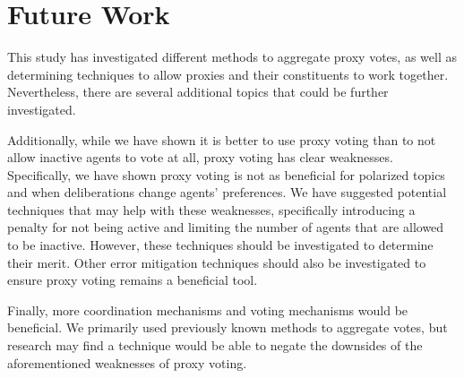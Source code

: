 \section{Future Work}\label{sec:future-work}
This study has investigated different methods to aggregate proxy votes, as well as
determining techniques to allow proxies and their constituents to work together.
Nevertheless, there are several additional topics that could be further investigated.

Additionally, while we have shown it is better to use proxy voting than to not allow
inactive agents to vote at all, proxy voting has clear weaknesses.
Specifically, we have shown proxy voting is not as beneficial for polarized
topics and when deliberations change agents' preferences.
We have suggested potential techniques that may help with these weaknesses,
specifically introducing a penalty for not being active and limiting the number of
agents that are allowed to be inactive.
However, these techniques should be investigated to determine their merit.
Other error mitigation techniques should also be investigated to ensure proxy voting
remains a beneficial tool.

Finally, more coordination mechanisms and voting mechanisms would be beneficial.
We primarily used previously known methods to aggregate votes, but research may
find a technique would be able to negate the downsides of the aforementioned
weaknesses of proxy voting.
